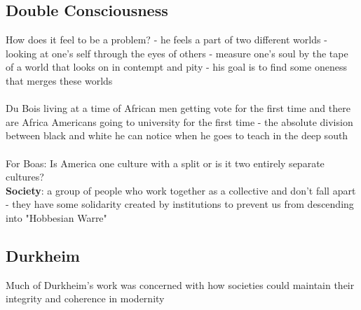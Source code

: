 \documentclass{article}
\begin{document}
\subsection{Double Consciousness}
How does it feel to be a problem? - he feels a part of two different worlds - looking at one's self through the eyes of others - measure one's soul by the tape of a world that looks on in contempt and pity - his goal is to find some oneness that merges these worlds \\ \\
Du Bois living at a time of African men getting vote for the first time and there are Africa Americans going to university for the first time - the absolute division between black and white he can notice when he goes to teach in the deep south \\ \\
For Boas: Is America one culture with a split or is it two entirely separate cultures? \\
\textbf{Society}: a group of people who work together as a collective and don't fall apart - they have some solidarity created by institutions to prevent us from descending into "Hobbesian Warre"

\subsection{Durkheim}
Much of Durkheim's work was concerned with how societies could maintain their integrity and coherence in modernity
\end{document}
